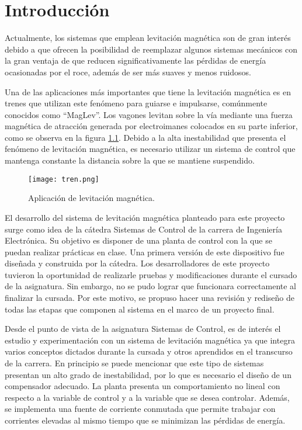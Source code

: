 \chapter{Introducción}  \label{cap:Introducción}

\noindent Actualmente, los sistemas que emplean levitación magnética son de gran interés debido a que ofrecen la posibilidad de reemplazar algunos sistemas mecánicos con la gran ventaja de que reducen significativamente las pérdidas de energía ocasionadas por el roce, además de ser más suaves y menos ruidosos. 

\noindent Una de las aplicaciones  más importantes que tiene la levitación magnética es en trenes que utilizan este fenómeno para guiarse e impulsarse, comúnmente conocidos como ``MagLev''. Los vagones levitan sobre la vía mediante una fuerza magnética de atracción generada por electroimanes colocados en su parte inferior, como se  observa en la figura \ref{fig:img_tren}. Debido a la alta inestabilidad que presenta el fenómeno de levitación magnética, es necesario utilizar un sistema de control que mantenga constante la distancia sobre la que se mantiene suspendido.

\begin{figure}[H]
	\centering
	\texttt{[image: tren.png]}
	\caption{Aplicación de levitación magnética.}
	\label{fig:img_tren}
\end{figure}

\noindent El desarrollo del sistema de levitación magnética planteado para este proyecto surge como idea de la cátedra Sistemas de Control de la carrera de Ingeniería Electrónica. Su objetivo es disponer de una planta de control con la  que se puedan realizar prácticas en clase. Una primera versión de este dispositivo fue diseñada y construida por la cátedra. Los desarrolladores de este proyecto tuvieron la oportunidad de realizarle pruebas y modificaciones durante el cursado de la asignatura. Sin embargo, no se pudo lograr que funcionara correctamente al finalizar la cursada. Por este motivo, se propuso hacer una revisión y rediseño de todas las etapas que componen al sistema en el marco de un proyecto final.

Desde el punto de vista de la asignatura Sistemas de Control, es de interés el estudio y experimentación con un sistema de levitación magnética ya que integra varios conceptos dictados durante la cursada y otros aprendidos en el transcurso de la carrera. En principio se puede mencionar que este tipo de sistemas presentan un alto grado de inestabilidad, por lo que es necesario el diseño de un compensador adecuado. La planta presenta un comportamiento no lineal con respecto a la variable de control y a la variable que se desea controlar. Además, se implementa una fuente de corriente conmutada que permite trabajar con corrientes elevadas al mismo tiempo que se minimizan las pérdidas de energía.

